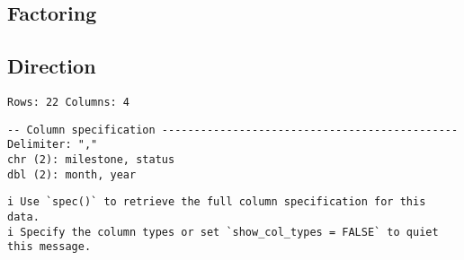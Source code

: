 \hypertarget{factoring}{%
\subsection{Factoring}\label{factoring}}
\begin{Shaded}
\begin{Highlighting}[]
\OtherTok{\textless{}{-}} \NormalTok{(}\NormalTok{, }\NormalTok{, }\NormalTok{, }\NormalTok{)}

\OtherTok{\textless{}{-}} \NormalTok{(}\NormalTok{, }\NormalTok{, }\NormalTok{, }\NormalTok{)}

\SpecialCharTok{$}\OtherTok{\textless{}{-}} \SpecialCharTok{$}\NormalTok{)}
\end{Highlighting}
\end{Shaded}
\hypertarget{direction}{%
\subsection{Direction}\label{direction}}
\begin{Shaded}
\begin{Highlighting}[]
\OtherTok{\textless{}{-}}\SpecialCharTok{::}\SpecialCharTok{::}\NormalTok{(}\NormalTok{))}
\end{Highlighting}
\end{Shaded}
\begin{verbatim}
Rows: 22 Columns: 4
\end{verbatim}
\begin{verbatim}
-- Column specification ----------------------------------------------
Delimiter: ","
chr (2): milestone, status
dbl (2): month, year
\end{verbatim}
\begin{verbatim}
i Use `spec()` to retrieve the full column specification for this data.
i Specify the column types or set `show_col_types = FALSE` to quiet this message.
\end{verbatim}
